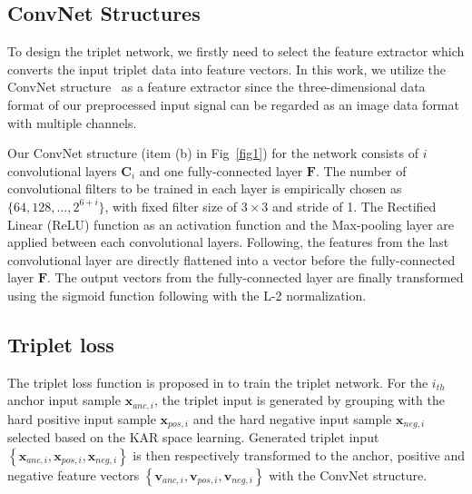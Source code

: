 \documentclass[runningheads]{llncs}
\begin{document}
\subsection{ConvNet Structures}

To design the triplet network, we firstly need to select the feature extractor which converts the input triplet data into feature vectors. In this work, we utilize the ConvNet structure~\cite{lecun1998gradient} as a feature extractor since the three-dimensional data format of our preprocessed input signal can be regarded as an image data format with multiple channels. 

Our ConvNet structure (item (b) in Fig~\ref{fig1}) for the network consists of $i$ convolutional layers $\mathbf{C}_{i}$ and one fully-connected layer $\mathbf{F}$. The number of convolutional filters to be trained in each layer is empirically chosen as $\{64, 128, ...,  2^{6+i}\}$, with fixed filter size of $3\times3$ and stride of 1. The Rectiﬁed Linear (ReLU) function as an activation function and the Max-pooling layer are applied between each convolutional layers. Following, the features from the last convolutional layer are directly flattened into a vector before the fully-connected layer $\mathbf{F}$.
The output vectors from the fully-connected layer are finally transformed using the sigmoid function following with the L-2 normalization.


\subsection{Triplet loss}

The triplet loss function is proposed in \cite{hoffer2015deep} to train the triplet network.
For the $i_{th}$ anchor input sample $\mathbf{x}_{anc,i}$, the triplet input is generated by grouping with the hard positive input sample $\mathbf{x}_{pos,i}$ and the hard negative input sample $\mathbf{x}_{neg,i}$ selected based on the KAR space learning. Generated triplet input $\left\{\mathbf{x}_{anc,i},\mathbf{x}_{pos,i},\mathbf{x}_{neg,i}\right\}$ is then respectively transformed to the anchor, positive and negative feature vectors $\left\{\mathbf{v}_{anc,i},\mathbf{v}_{pos,i},\mathbf{v}_{neg,i}\right\}$ with the ConvNet structure.
\end{document}
